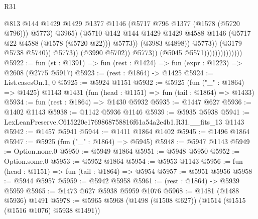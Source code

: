 \begin{lexlean}{R31}
\begin{coremodule}
                                                      @813
                                                      @144
                                                      @1429
                                                      @1429
                                                      @1377
                                                      @1146
                                                      (@5717 @796 @1377 (@1578 (@5720 @796)))
                                                      @5773)
                                                    @3965)
                                                  (@5710
                                                    @142
                                                    @144
                                                    @1429
                                                    @1429
                                                    @4588
                                                    @1146
                                                    (@5717 @22 @4588 (@1578 (@5720 @22)))
                                                    @5773))
                                                (@3983 @4898))
                                              @5773))
                                          (@3179 @5738 @5740))
                                        @5773))
                                    (@3990 @5702))
                                  @5773))
                              (@5045 @5571))))))))))))))
@5922 := fun (st : @1391) => fun (rest : @1424) => fun (expr : @1223) => @2608 (@2775 @5917)
@5923 := (rest : @1864) -> @1425
@5924 := List.casesOn.{1, 0}
@5925 := @5924 @1151
@5932 := @5925
    (fun ("_" : @1864) => @1425)
    @1143
    @1431
    (fun (head : @1151) => fun (tail : @1864) => @1433)
@5934 := fun (rest : @1864) => @1430 @5932
@5935 := @1447 @627
@5936 := @1402 @1143
@5938 := @1142 @5936 @1146
@5939 := @5935 @5938
@5941 := LexLeanPreserve.C615220e1769868758816f61a54a2e4b1.R31.__fits_13 @1143
@5942 := @1457 @5941
@5944 := @1411 @1864 @1402
@5945 := @1496 @1864
@5947 := @5925 (fun ("_" : @1864) => @5945)
@5948 := @5947 @1143
@5949 := Option.none.{0}
@5950 := @5949 @1864
@5951 := @5948 @5950
@5952 := Option.some.{0}
@5953 := @5952 @1864
@5954 := @5953 @1143
@5956 := fun (head : @1151) => fun (tail : @1864) => @5954
@5957 := @5951 @5956
@5958 := @5944 @5957
@5959 := @5942 @5958
@5961 := (rest : @1864) -> @5939 @5959
@5965 := @1473 @627 @5938 @5959 @1076
@5968 := @1481 (@1488 @5936) @1491
@5978 := @5965 @5968 (@1498 (@1508 @627)) (@1514 (@1515 (@1516 @1076) @5938 @1491))

\end{coremodule}
\end{lexlean}
